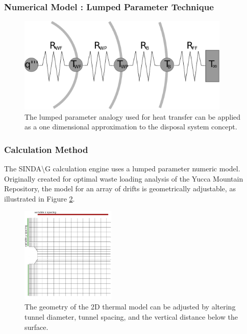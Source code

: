 \begin{frame}[ctb!]
  \frametitle{Numerical Model : Lumped Parameter Technique}
  \begin{figure}[h!]
    \begin{center}
      \includegraphics[width=0.9\textwidth]{lumpedParam.eps}
    \end{center}
    \caption{The lumped parameter analogy used for heat transfer can be applied 
    as a one dimensional approximation to the disposal system concept. }
    \label{fig:lumpedParam}
  \end{figure}
\end{frame}



\begin{frame}[ctb!]
\frametitle{Calculation Method}

The SINDA{\textbackslash}G  calculation engine uses a lumped parameter numeric model.
Originally created for optimal waste loading analysis of the Yucca Mountain 
Repository, the 
model for an array of drifts is geometrically adjustable,  as illustrated in 
Figure \ref{fig:sindageom}. 

\begin{figure}[htbp!]
  \begin{center}
    \includegraphics[width=0.4\textwidth]{./sindageom.eps}
  \end{center}
  \caption{The geometry of the 2D thermal model can be adjusted by altering 
  tunnel diameter, tunnel spacing, and the vertical distance below the surface.}
  \label{fig:sindageom}
\end{figure}
\end{frame}

